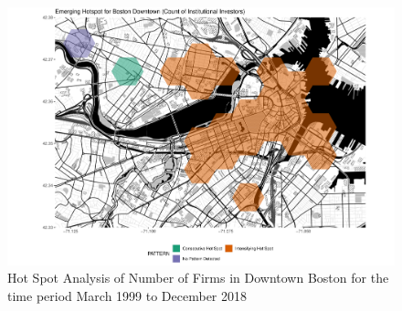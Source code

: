 \begin{figure}
	\centering
	\includegraphics[width=1\linewidth]{Figures/ChapterIV/Bos_Count_EH_Downtown}
	\caption[Hot Spot Analysis of Number of Firms in Downtown Boston 1999-2018]{Hot Spot Analysis of Number of Firms in Downtown Boston for the time period March 1999 to December 2018}
	\label{fig:bostoncounthotspot_Downtown}
\end{figure}

